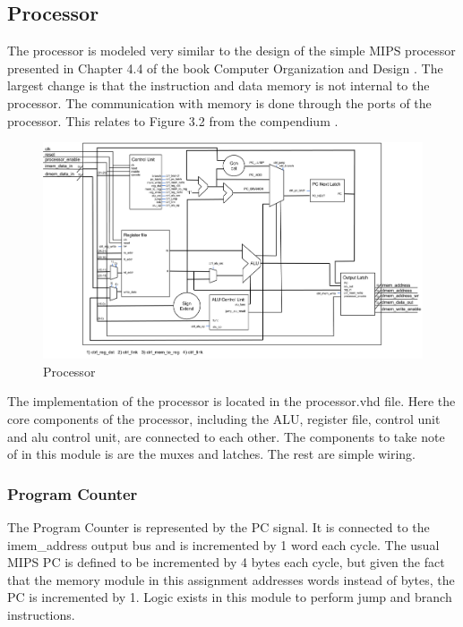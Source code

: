 \subsection{Processor}

The processor is modeled very similar to the design of the simple MIPS processor 
presented in Chapter 4.4 of the book Computer Organization and Design \cite{curriculum}. 
The largest change is that the instruction and data memory is not internal to the processor.
 The communication with memory is done through the ports of the processor. This relates to 
Figure 3.2 from the compendium \cite{compendium}. 

\begin{figure}[h]
	\centerline{\includegraphics[width=550px]{figures/processor.png}}
	\caption{Processor}
\end{figure}

The implementation of the processor is located in the processor.vhd file. Here the core 
components of the processor, including the ALU, register file, control unit and alu control 
unit, are connected to each other. The components to take note of in this module is are 
the muxes and latches. The rest are simple wiring. 

\subsubsection{Program Counter}
The Program Counter is represented by the PC signal. It is connected to the imem\_address 
output bus and is incremented by 1 word each cycle. The usual MIPS PC is defined to be 
incremented by 4 bytes each cycle, but given the fact that the memory module in this 
assignment addresses words instead of bytes, the PC is incremented by 1. Logic exists 
in this module to perform jump and branch instructions. 

